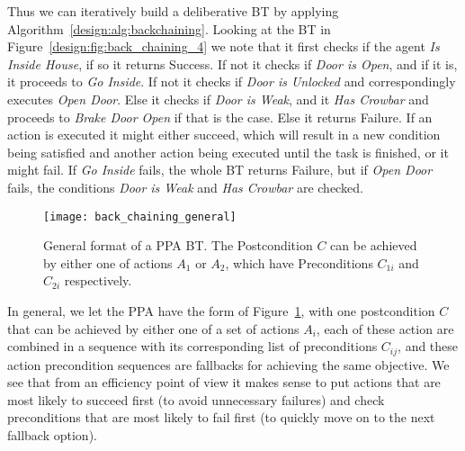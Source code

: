Thus we can iteratively build a deliberative BT by applying   Algorithm~\ref{design:alg:backchaining}.
Looking at the BT in Figure~\ref{design:fig:back_chaining_4} we note that it first checks if the agent \emph{Is Inside House}, if so it returns Success. If not it checks if \emph{Door is Open}, and if it is, it proceeds to \emph{Go Inside}. If not it checks if \emph{Door is Unlocked} and correspondingly executes \emph{Open Door}. Else it checks if \emph{Door is Weak}, and it \emph{Has Crowbar} and proceeds to \emph{Brake Door Open} if that is the case. Else it returns Failure. If an action is executed it might either succeed, which will result in a new condition being satisfied and another action being executed until the task is finished, or it might fail. If \emph{Go Inside} fails, the whole BT returns Failure, but if \emph{Open Door} fails, the conditions \emph{Door is Weak} and \emph{Has Crowbar} are checked.

\begin{figure}[h]
\centering
\texttt{[image: back\_chaining\_general]}
\caption{General format of a PPA BT. The Postcondition $C$ can be achieved by either one of actions $A_1$ or $A_2$, which have Preconditions $C_{1i}$ and $C_{2i}$ respectively.}
\label{design:fig:back_chaining_general}
\end{figure}

In general, we let the PPA have the form of Figure~\ref{design:fig:back_chaining_general}, with one postcondition $C$ that can be achieved by either one of a set of actions $A_i$, each of these action are combined in a sequence with its corresponding list of preconditions $C_{ij}$, and these action precondition sequences are fallbacks for achieving the same objective. We see that from an efficiency point of view it makes sense to put actions that are most likely to succeed first (to avoid unnecessary failures) and check preconditions that are most likely to fail first (to quickly move on to the next fallback option).



